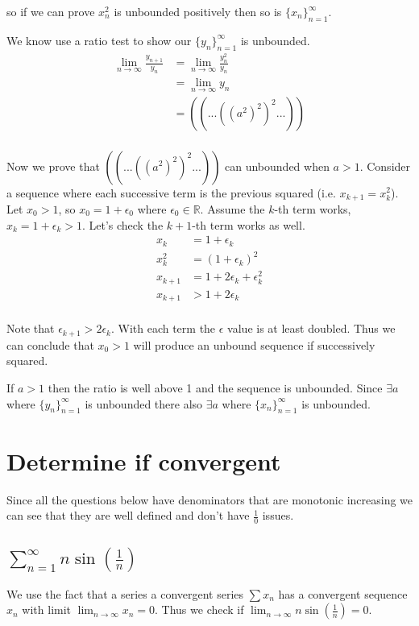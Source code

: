 \documentclass{article}
\begin{document}
so if we can prove $x_n^2$ is unbounded positively then so is 
$\{x_n\}_{n=1}^\infty$.

We know use a ratio test to show our $\{y_n\}_{n=1}^\infty$ is unbounded.
\begin{align*}
    \lim_{n \to \infty} \frac{y_{n+1}}{y_n}
    &= \lim_{n \to \infty} \frac{y_n^2}{y_n} \\
    &= \lim_{n \to \infty} y_n \\
    &= ((...((a^2)^2)^2...)) \\
\end{align*}

Now we prove that $((...((a^2)^2)^2...))$ can unbounded when $a > 1$.
Consider a sequence where each successive term is the previous squared
(i.e. $x_{k+1} = x_k^2$). Let $x_0 > 1$, so $x_0 = 1 + \epsilon_0$ where
$\epsilon_0 \in \mathbb{R}$. Assume the $k$-th term works,
$x_k = 1 + \epsilon_k > 1$. Let's check the $k+1$-th term works as well.
\begin{align*}
    x_k &= 1 + \epsilon_k \\
    x_k^2 &= (1 + \epsilon_k)^2 \\
    x_{k+1} &= 1 + 2\epsilon_k + \epsilon_k^2 \\
    x_{k+1} &> 1 + 2\epsilon_k \\
\end{align*}

Note that $\epsilon_{k+1} > 2\epsilon_k$. With each term the $\epsilon$ value
is at least doubled. Thus we can conclude that $x_0 > 1$ will produce an
unbound sequence if successively squared.

If $a > 1$ then the ratio is well above 1 and the sequence is unbounded.
Since $\exists a$ where $\{y_n\}_{n=1}^\infty$ is unbounded there also
$\exists a$ where $\{x_n\}_{n=1}^\infty$ is unbounded.

\section{Determine if convergent}
Since all the questions below have denominators that are monotonic increasing
we can see that they are well defined and don't have $\frac{1}{0}$ issues.

\subsection{$\sum^\infty_{n=1} n\sin\left(\frac{1}{n}\right)$}
We use the fact that a series a convergent series $\sum x_n$ has a convergent
sequence $x_n$ with limit $\lim_{n \to \infty} x_n = 0$.
Thus we check if $\lim_{n \to \infty} n\sin\left(\frac{1}{n}\right) = 0$.
\end{document}
